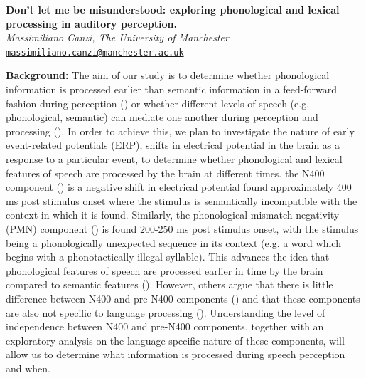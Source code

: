 \documentclass[12pt,a4paper]{article}
\newcommand\email[1]{{\tt\href{mailto:#1}{#1}}} %
\begin{document}
\raggedbottom
\begin{center}
\textbf{Don't let me be misunderstood: exploring phonological and lexical processing in auditory perception.}\\
\vspace{0.5em}
\textit{Massimiliano Canzi, The University of Manchester}\\
\vspace{0.25em}
\email{massimiliano.canzi@manchester.ac.uk}
\end{center}

\textbf{Background:} The aim of our study is to determine whether phonological information is processed earlier than semantic information in a feed-forward fashion during perception (\citealt{mcqueen2009}) or whether different levels of speech (e.g. phonological, semantic) can mediate one another during perception and processing (\citealt{mcclelland1986}). In order to achieve this, we plan to investigate the nature of early event-related potentials (ERP), shifts in electrical potential in the brain as a response to a particular event, to determine whether phonological and lexical features of speech are processed by the brain at different times. the N400 component (\citealt{kutas1980}) is a negative shift in electrical potential found approximately 400 ms post stimulus onset where the stimulus is semantically incompatible with the context in which it is found. Similarly, the phonological mismatch negativity (PMN) component (\citealt{groppe2010}) is found 200-250 ms post stimulus onset, with the stimulus being a phonologically unexpected sequence in its context (e.g. a word which begins with a phonotactically illegal syllable). This advances the idea that phonological features of speech are processed earlier in time by the brain compared to semantic features (\citealt{mcqueen2009}). However, others argue that there is little difference between N400 and pre-N400 components (\citealt{diaz2007}) and that these components are also not specific to language processing (\citealt{dikker2011}). Understanding the level of independence between N400 and pre-N400 components, together with an exploratory analysis on the language-specific nature of these components, will allow us to determine what information is processed during speech perception and when.
\end{document}
